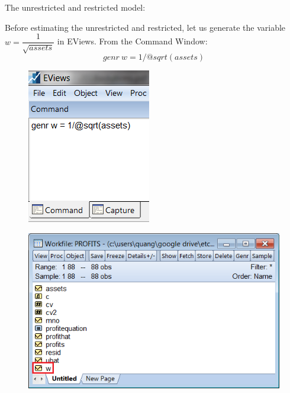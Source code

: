 \documentclass[12pt]{report}
\begin{document}
\noindent The unrestricted and restricted model:

\noindent Before estimating the unrestricted and restricted, let us generate the variable $w = \dfrac{1}{\sqrt{assets}}$ in EViews. From the Command Window: $$genr\ w=1/@sqrt(assets)$$
\begin{figure}[H]
	\centering
	\includegraphics{tute9_9}
\end{figure}
\vspace{-\baselineskip}
\begin{figure}[H]
	\centering
	\includegraphics{tute9_10}
\end{figure}
\vspace{-\baselineskip}
\end{document}
